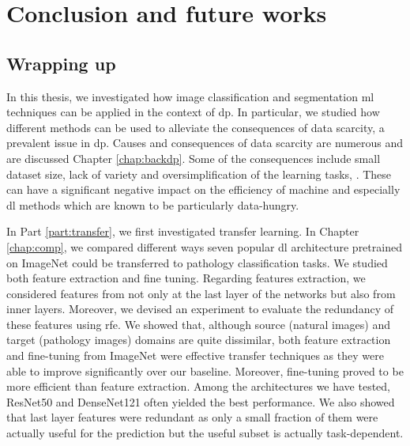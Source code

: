 \chapter{Conclusion and future works}
\label{chap:conclusions}

\section{Wrapping up}

In this thesis, we investigated how image classification and segmentation \acrlong{ml} techniques can be applied in the context of \acrlong{dp}. In particular, we studied how different methods can be used to alleviate the consequences of data scarcity, a prevalent issue in \acrlong{dp}. Causes and consequences of data scarcity are numerous and are discussed Chapter \ref{chap:backdp}. Some of the consequences include small dataset size, lack of variety and oversimplification of the learning tasks, \etc. These can have a significant negative impact on the efficiency of machine and especially \acrlong{dl} methods which are known to be particularly data-hungry. 

In Part \ref{part:transfer}, we first investigated transfer learning. In Chapter \ref{chap:comp}, we compared different ways seven popular \acrlong{dl} architecture pretrained on ImageNet could be transferred to pathology classification tasks. We studied both feature extraction and fine tuning. Regarding features extraction, we considered features from not only at the last layer of the networks but also from inner layers. Moreover, we devised an experiment to evaluate the redundancy of these features using \acrlong{rfe}. We showed that, although source (\ie natural images) and target (\ie pathology images) domains are quite dissimilar, both feature extraction and fine-tuning from ImageNet were effective transfer techniques as they were able to improve significantly over our baseline. Moreover, fine-tuning proved to be more efficient than feature extraction. Among the architectures we have tested, ResNet50 and DenseNet121 often yielded the best performance. We also showed that last layer features were redundant as only a small fraction of them were actually useful for the prediction but the useful subset is actually task-dependent. 

